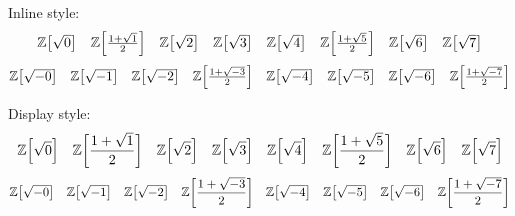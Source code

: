 \documentclass[10pt]{extarticle}
\begin{document}
Inline style:
\begin{equation*}\textstyle
    \Zd{0} \quad \Zd{1} \quad \Zd{2} \quad \Zd{3} \quad \Zd{4} \quad \Zd{5} \quad \Zd{6} \quad \Zd{7}
\end{equation*}
\begin{equation*}\textstyle
    \Zd{-0} \quad \Zd{-1} \quad \Zd{-2} \quad \Zd{-3} \quad \Zd{-4} \quad \Zd{-5} \quad \Zd{-6} \quad \Zd{-7}
\end{equation*}

Display style:
\begin{equation*}
    \Zd{0} \quad \Zd{1} \quad \Zd{2} \quad \Zd{3} \quad \Zd{4} \quad \Zd{5} \quad \Zd{6} \quad \Zd{7}
\end{equation*}
\begin{equation*}
    \Zd{-0} \quad \Zd{-1} \quad \Zd{-2} \quad \Zd{-3} \quad \Zd{-4} \quad \Zd{-5} \quad \Zd{-6} \quad \Zd{-7}
\end{equation*}
\end{document}
